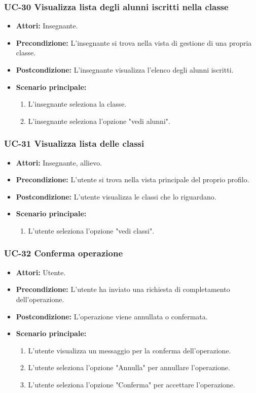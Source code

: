 \subsubsection{UC-30 Visualizza lista degli alunni iscritti nella classe}		
\begin{itemize}
	\item \textbf{Attori:} Insegnante.
	\item \textbf{Precondizione:} L'insegnante si trova nella vista di gestione di una propria classe.
	\item \textbf{Postcondizione:} L'insegnante visualizza l'elenco degli alunni iscritti.
	\item \textbf{Scenario principale:}
	\begin{enumerate}
		\item L'insegnante seleziona la classe.
		\item L'insegnante seleziona l'opzione "vedi alunni".
	\end{enumerate}		
\end{itemize}

\subsubsection{UC-31 Visualizza lista delle classi}		
\begin{itemize}
	\item \textbf{Attori:} Insegnante, allievo.
	\item \textbf{Precondizione:} L'utente si trova nella vista principale del proprio profilo.
	\item \textbf{Postcondizione:} L'utente visualizza le classi che lo riguardano.
	\item \textbf{Scenario principale:}
	\begin{enumerate}
		\item L'utente seleziona l'opzione "vedi classi".
	\end{enumerate}		
\end{itemize}

\subsubsection{UC-32 Conferma operazione}		
\begin{itemize}
	\item \textbf{Attori:} Utente.
	\item \textbf{Precondizione:} L'utente ha inviato una richiesta di completamento dell'operazione.
	\item \textbf{Postcondizione:} L'operazione viene annullata o confermata.
	\item \textbf{Scenario principale:}
	\begin{enumerate}
		\item L'utente visualizza un messaggio per la conferma dell'operazione.
		\item L'utente seleziona l'opzione "Annulla" per annullare l'operazione.
		\item L'utente seleziona l'opzione "Conferma" per accettare l'operazione.
	\end{enumerate}		
\end{itemize}
